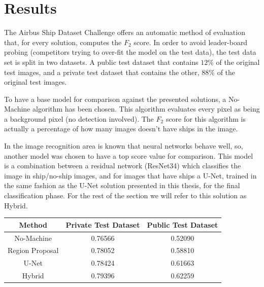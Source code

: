 \chapter{Results}
\label{Results}

The Airbus Ship Dataset Challenge \cite{AirbusDataSetChallenge} offers an automatic method of evaluation that, for every solution, computes the $F_2$ score. In order to avoid leader-board probing (competitors trying to over-fit the model on the test data), the test data set is split in two datasets. A public test dataset that contains $12\%$ of the original test images, and a private test dataset that contains the other, $88\%$ of the original test images.

To have a base model for comparison against the presented solutions, a No-Machine algorithm has been chosen. This algorithm evaluates every pixel as being a background pixel (no detection involved). The $F_2$ score for this algorithm is actually a percentage of how many images doesn't have ships in the image.

In the image recognition area is known that neural networks behave well, so, another model was chosen to have a top score value for comparison. This model is a combination between a residual network (ResNet34) which classifies the image in ship/no-ship images, and for images that have ships a U-Net, trained in the same fashion as the U-Net solution presented in this thesis, for the final classification phase. For the rest of the section we will refer to this solution as Hybrid.
\begin{table}[h]
	\centering
	\begin{tabular}{|c|c|c|}
		\hline
		Method & Private Test Dataset & Public Test Dataset \\ \hline
		No-Machine & 0.76566	& 0.52090  \\ \hline
		Region Proposal & 0.78052	& 0.58810 \\ \hline
		U-Net & 0.78424	& 0.61663  \\ \hline
		Hybrid & 0.79396 & 0.62259 \\ \hline
	\end{tabular}
	\label{resultOnComp}
\end{table}

